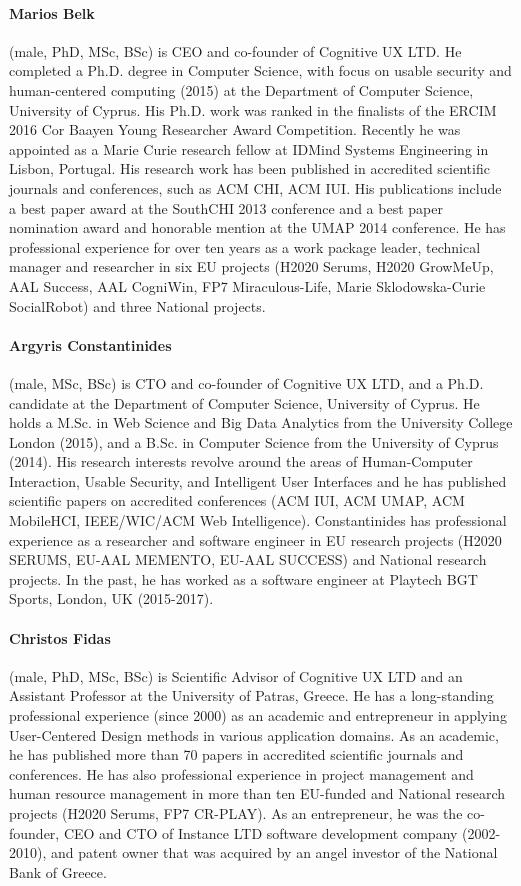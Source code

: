 \documentclass[a4paper,11pt]{article}
\begin{document}
\paragraph{Marios Belk} (male, PhD, MSc, BSc) is CEO and co-founder of Cognitive UX LTD. He completed a Ph.D. degree in Computer Science, with focus on usable security and human-centered computing (2015) at the Department of Computer Science, University of Cyprus. His Ph.D. work was ranked in the finalists of the ERCIM 2016 Cor Baayen Young Researcher Award Competition. Recently he was appointed as a Marie Curie research fellow at IDMind Systems Engineering in Lisbon, Portugal. His research work has been published in accredited scientific journals and conferences, such as ACM CHI, ACM IUI. His publications include a best paper award at the SouthCHI 2013 conference and a best paper nomination award and honorable mention at the UMAP 2014 conference. He has professional experience for over ten years as a work package leader, technical manager and researcher in six EU projects (H2020 Serums, H2020 GrowMeUp, AAL Success, AAL CogniWin, FP7 Miraculous-Life, Marie Sklodowska-Curie SocialRobot) and three National projects.

\paragraph{Argyris Constantinides} (male, MSc, BSc) is CTO and co-founder of Cognitive UX LTD, and a Ph.D. candidate at the Department of Computer Science, University of Cyprus. He holds a M.Sc. in Web Science and Big Data Analytics from the University College London (2015), and a B.Sc. in Computer Science from the University of Cyprus (2014). His research interests revolve around the areas of Human-Computer Interaction, Usable Security, and Intelligent User Interfaces and he has published scientific papers on accredited conferences (ACM IUI, ACM UMAP, ACM MobileHCI, IEEE/WIC/ACM Web Intelligence). Constantinides has professional experience as a researcher and software engineer in EU research projects (H2020 SERUMS, EU-AAL MEMENTO, EU-AAL SUCCESS) and National research projects. In the past, he has worked as a software engineer at Playtech BGT Sports, London, UK (2015-2017).

\paragraph{Christos Fidas} (male, PhD, MSc, BSc) is Scientific Advisor of Cognitive UX LTD and an Assistant Professor at the University of Patras, Greece. He has a long-standing professional experience (since 2000) as an academic and entrepreneur in applying User-Centered Design methods in various application domains. As an academic, he has published more than 70 papers in accredited scientific journals and conferences. He has also professional experience in project management and human resource management in more than ten EU-funded and National research projects (H2020 Serums, FP7 CR-PLAY). As an entrepreneur, he was the co-founder, CEO and CTO of Instance LTD software development company (2002-2010), and patent owner that was acquired by an angel investor of the National Bank of Greece.
\end{document}
